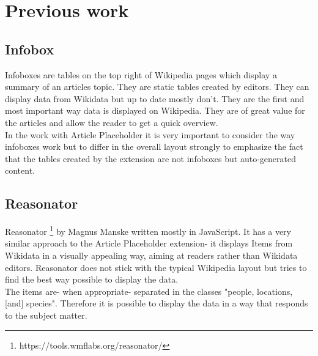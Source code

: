 \section{Previous work}
\subsection{Infobox}
Infoboxes are tables on the top right of Wikipedia pages which display a summary of an articles topic. They are static tables created by editors. They can display data from Wikidata but up to date mostly don't. They are the first and most important way data is displayed on Wikipedia. They are of great value for the articles and allow the reader to get a quick overview. \\
In the work with Article Placeholder it is very important to consider the way infoboxes work but to differ in the overall layout strongly to emphasize the fact that the tables created by the extension are not infoboxes but auto-generated content. 

\subsection{Reasonator}
Reasonator \footnote{https://tools.wmflabs.org/reasonator/} by Magnus Manske written mostly in JavaScript. It has a very similar approach to the Article Placeholder extension- it displays Items from Wikidata in a visually appealing way, aiming at readers rather than Wikidata editors. Reasonator does not stick with the typical Wikipedia layout but tries to find the best way possible to display the data. \\
The items are- when appropriate- separated in the classes   "people, locations, [and] species". Therefore it is possible to display the data in a way that responds to the subject matter. \\


